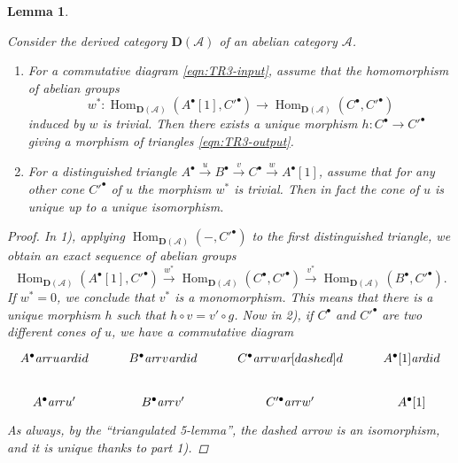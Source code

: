 \documentclass[leqno,12pt]{article}
\theoremstyle{plain}
\newtheorem{lemma}[theorem]{\indent\sc Lemma}
\theoremstyle{definition}
\DeclareMathOperator{\Hom}{Hom}
\newcommand{\ar}{\text{\it ar}}
\begin{document}
\begin{lemma}
  \label{TR3-TR1-with-uniqueness-general-statement}

  Consider the derived category $\mathbf{D} (\mathcal{A})$ of an abelian
  category $\mathcal{A}$.

  \begin{enumerate}
  \item[$1)$] For a commutative diagram \eqref{eqn:TR3-input}, assume that the
    homomorphism of abelian groups
    \[ w^*\colon \Hom_{\mathbf{D} (\mathcal{A})} (A^\bullet [1], C'^\bullet) \to
    \Hom_{\mathbf{D} (\mathcal{A})} (C^\bullet, C'^\bullet) \]
    induced by $w$ is trivial. Then there exists a unique morphism
    $h\colon C^\bullet \to C'^\bullet$ giving a morphism of triangles
    \eqref{eqn:TR3-output}.

  \item[$2)$] For a distinguished triangle
    $A^\bullet \xrightarrow{u} B^\bullet \xrightarrow{v} C^\bullet \xrightarrow{w} A^\bullet[1]$,
    assume that for any other cone $C'^\bullet$
    of $u$ the morphism $w^*$ is trivial. Then in fact the cone of $u$ is unique
    up to a unique isomorphism.
  \end{enumerate}

  \begin{proof}
    In 1), applying $\Hom_{\mathbf{D} (\mathcal{A})} (-, C'^\bullet)$ to the
    first distinguished triangle, we obtain an exact sequence of abelian groups
    \[ \Hom_{\mathbf{D} (\mathcal{A})} (A^\bullet [1], C'^\bullet) \xrightarrow{w^*}
    \Hom_{\mathbf{D} (\mathcal{A})} (C^\bullet, C'^\bullet) \xrightarrow{v^*}
    \Hom_{\mathbf{D} (\mathcal{A})} (B^\bullet, C'^\bullet). \]
    If $w^* = 0$, we conclude that $v^*$ is a monomorphism. This means that
    there is a unique morphism $h$ such that $h\circ v = v'\circ g$. Now in 2),
    if $C^\bullet$ and $C'^\bullet$ are two different cones of $u$, we have a
    commutative diagram
    \[ \begin{tikzcd}
      A^\bullet\ar{r}{u}\ar{d}{id} & B^\bullet\ar{r}{v}\ar{d}{id} & C^\bullet\ar{r}{w}\ar[dashed]{d} & A^\bullet [1]\ar{d}{id} \\
      A^\bullet\ar{r}{u'} & B^\bullet\ar{r}{v'} & C'^\bullet\ar{r}{w'} & A^\bullet [1]
    \end{tikzcd} \]
    As always, by the ``triangulated 5-lemma'', the dashed arrow is an
    isomorphism, and it is unique thanks to part 1).
  \end{proof}
\end{lemma}
\end{document}

